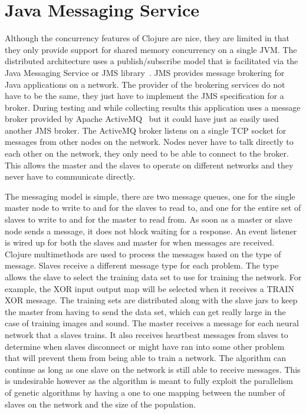 \section{Java Messaging Service}
Although the concurrency features of Clojure are nice, they are limited in that they only provide support for shared memory concurrency on a single JVM. The distributed architecture uses a publish/subscribe model that is facilitated via the Java Messaging Service or JMS library~\cite{jms}. JMS provides message brokering for Java applications on a network. The provider of the brokering services do not have to be the same, they just have to implement the JMS specification for a broker. During testing and while collecting results this application uses a message broker provided by Apache ActiveMQ~\cite{activeMQ} but it could have just as easily used another JMS broker. The ActiveMQ broker listens on a single TCP socket for messages from other nodes on the network. Nodes never have to talk directly to each other on the network, they only need to be able to connect to the broker. This allows the master and the slaves to operate on different networks and they never have to communicate directly.

The messaging model is simple, there are two message queues, one for the single master node to write to and for the slaves to read to, and one for the entire set of slaves to write to and for the master to read from. As soon as a master or slave node sends a message, it does not block waiting for a response. An event listener is wired up for both the slaves and master for when messages are received. Clojure multimethods are used to process the messages based on the type of message. Slaves receive a different message type for each problem. The type allows the slave to select the training data set to use for training the network. For example, the XOR input output map will be selected when it receives a TRAIN XOR message. The training sets are distributed along with the slave jars to keep the master from having to send the data set, which can get really large in the case of training images and sound. The master receives a message for each neural network that a slaves trains. It also receives heartbeat messages from slaves to determine when slaves disconnect or might have ran into some other problem that will prevent them from being able to train a network. The algorithm can continue as long as one slave on the network is still able to receive messages. This is undesirable however as the algorithm is meant to fully exploit the parallelism of genetic algorithms by having a one to one mapping between the number of slaves on the network and the size of the population. 

